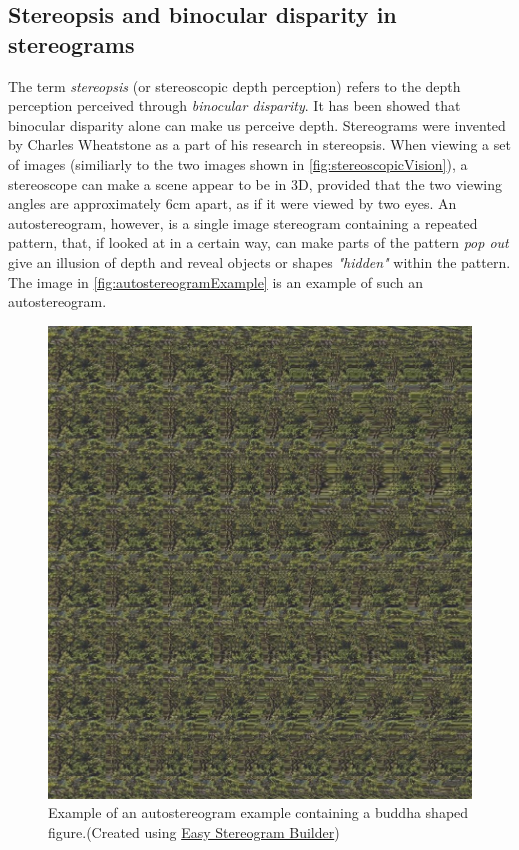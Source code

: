 \subsection{Stereopsis and binocular disparity in stereograms}\label{sec:stereograms}
The term \textit{stereopsis} (or stereoscopic depth perception) refers to the depth perception perceived through \textit{binocular disparity}\citep{sensationPerception,seeingInThreeDimensions}. It has been showed that binocular disparity alone can make us perceive depth\citep{autostereograms}. Stereograms were invented by Charles Wheatstone as a part of his research in stereopsis. 
When viewing a set of images (similiarly to the two images shown in \autoref{fig:stereoscopicVision}), a stereoscope can make a scene appear to be in 3D, provided that the two viewing angles are approximately 6cm apart, as if it were viewed by two eyes\citep[p.~212]{sensationPerception}. 
An autostereogram, however, is a single image stereogram containing a repeated pattern, that, if looked at in a certain way, can make parts of the pattern \textit{pop out} give an illusion of depth and reveal objects or shapes \textit{"hidden"} within the pattern\citep{autostereograms}. The image in \autoref{fig:autostereogramExample} is an example of such an autostereogram.

\begin{figure}[H]
	\centering
	\includegraphics[width=1\linewidth]{figure/Analysis/autostereogram.jpg}
	\caption{Example of an autostereogram example containing a buddha shaped figure.(Created using \href{http://www.easystereogrambuilder.com/3d-stereogram-maker.aspx}{\color{blue}Easy Stereogram Builder})}
	\label{fig:autostereogramExample}
\end{figure}

